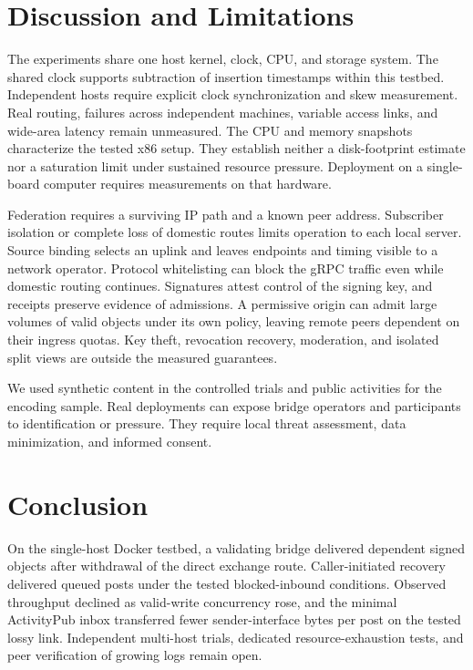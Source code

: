 \documentclass[conference,a4paper,10pt]{IEEEtran}
\begin{document}
\section{Discussion and Limitations}

The experiments share one host kernel, clock, CPU, and storage system. The shared clock supports subtraction of insertion timestamps within this testbed. Independent hosts require explicit clock synchronization and skew measurement. Real routing, failures across independent machines, variable access links, and wide-area latency remain unmeasured. The CPU and memory snapshots characterize the tested x86 setup. They establish neither a disk-footprint estimate nor a saturation limit under sustained resource pressure. Deployment on a single-board computer requires measurements on that hardware.

Federation requires a surviving IP path and a known peer address. Subscriber isolation or complete loss of domestic routes limits operation to each local server. Source binding selects an uplink and leaves endpoints and timing visible to a network operator. Protocol whitelisting can block the gRPC traffic even while domestic routing continues. Signatures attest control of the signing key, and receipts preserve evidence of admissions. A permissive origin can admit large volumes of valid objects under its own policy, leaving remote peers dependent on their ingress quotas. Key theft, revocation recovery, moderation, and isolated split views are outside the measured guarantees.

We used synthetic content in the controlled trials and public activities for the encoding sample. Real deployments can expose bridge operators and participants to identification or pressure. They require local threat assessment, data minimization, and informed consent.

\section{Conclusion}

On the single-host Docker testbed, a validating bridge delivered dependent signed objects after withdrawal of the direct exchange route. Caller-initiated recovery delivered queued posts under the tested blocked-inbound conditions. Observed throughput declined as valid-write concurrency rose, and the minimal ActivityPub inbox transferred fewer sender-interface bytes per post on the tested lossy link. Independent multi-host trials, dedicated resource-exhaustion tests, and peer verification of growing logs remain open.



\end{document}
